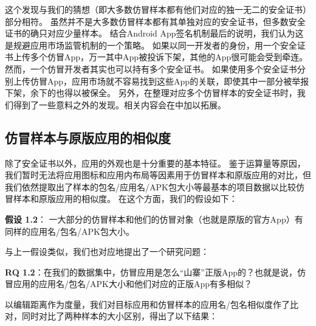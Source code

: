 这个发现与我们的猜想（即大多数仿冒样本都有他们对应的独一无二的安全证书）部分相符。
虽然并不是大多数仿冒样本都有其单独对应的安全证书，但多数安全证书的确只对应少量样本。
结合Android App签名机制最后的说明，我们认为这是规避应用市场监管机制的一个策略。
如果以同一开发者的身份，用一个安全证书上传多个仿冒App，万一其中App被投诉下架，其他的App很可能会受到牵连。
然而，一个仿冒开发者其实也可以持有多个安全证书。
如果使用多个安全证书分别上传仿冒App，应用市场就不容易找到这些App的关联，即使其中一部分被举报下架，余下的也得以被保全。
另外，在整理对应多个仿冒样本的安全证书时，我们得到了一些意料之外的发现。相关内容会在中加以拓展。

\subsection{仿冒样本与原版应用的相似度}

除了安全证书以外，应用的外观也是十分重要的基本特征。
鉴于运算量等原因，我们暂时无法将应用图标和应用内布局等因素用于仿冒样本和原版应用的对比，但我们依然提取出了样本的包名/应用名/APK包大小等最基本的项目数据以比较仿冒样本和原版应用的相似度。
在这个方面，我们的假设如下：

{\bf 假设 1.2}： 一大部分的仿冒样本和他们的仿冒对象（也就是原版的官方App）有同样的应用名/包名/APK包大小。

与上一假设类似，我们也对应地提出了一个研究问题：

{\bf RQ 1.2}：在我们的数据集中，仿冒应用是怎么``山寨''正版App的？也就是说，仿冒应用的应用名/包名/APK大小和他们对应的正版App有多相似？

以编辑距离作为度量，我们对目标应用和仿冒样本的应用名/包名相似度作了比对，同时对比了两种样本的大小区别，得出了以下结果：

